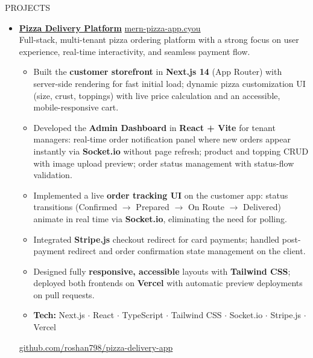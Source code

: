 \documentclass{resume}
\begin{document}
\begin{rSection}{PROJECTS}
\begin{itemize}

\item \href{https://github.com/roshan798/pizza-delivery-app}{\textbf{Pizza Delivery Platform}}
  \hfill \href{https://mern-pizza-app.cyou}{mern-pizza-app.cyou}\\
  Full-stack, multi-tenant pizza ordering platform with a strong focus on
  user experience, real-time interactivity, and seamless payment flow.
  \begin{itemize}
    \itemsep -3pt
    \item Built the \textbf{customer storefront} in \textbf{Next.js 14}
          (App Router) with server-side rendering for fast initial load;
          dynamic pizza customization UI (size, crust, toppings) with
          live price calculation and an accessible, mobile-responsive cart.
    \item Developed the \textbf{Admin Dashboard} in \textbf{React + Vite}
          for tenant managers: real-time order notification panel where new
          orders appear instantly via \textbf{Socket.io} without page refresh;
          product and topping CRUD with image upload preview; order status
          management with status-flow validation.
    \item Implemented a live \textbf{order tracking UI} on the customer app:
          status transitions (Confirmed $\to$ Prepared $\to$ On Route $\to$
          Delivered) animate in real time via \textbf{Socket.io},
          eliminating the need for polling.
    \item Integrated \textbf{Stripe.js} checkout redirect for card payments;
          handled post-payment redirect and order confirmation state management
          on the client.
    \item Designed fully \textbf{responsive, accessible} layouts with
          \textbf{Tailwind CSS}; deployed both frontends on \textbf{Vercel}
          with automatic preview deployments on pull requests.
    \item \textbf{Tech:} Next.js \(\cdot\) React \(\cdot\) TypeScript \(\cdot\)
          Tailwind CSS \(\cdot\) Socket.io \(\cdot\) Stripe.js \(\cdot\) Vercel
  \end{itemize}
  \href{https://github.com/roshan798/pizza-delivery-app}{github.com/roshan798/pizza-delivery-app}


\end{itemize}
\end{rSection}
\end{document}
